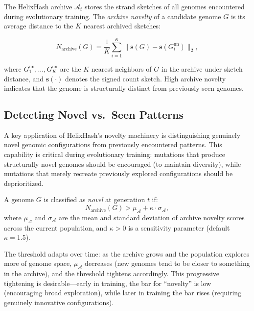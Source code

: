 The HelixHash archive $\mathcal{A}_t$ stores the strand sketches of all genomes encountered during evolutionary training. The \emph{archive novelty} of a candidate genome $G$ is its average distance to the $K$ nearest archived sketches:

\begin{equation}
N_{\text{archive}}(G) = \frac{1}{K} \sum_{i=1}^{K} \|\mathbf{s}(G) - \mathbf{s}(G_i^{\text{nn}})\|_2,
\label{eq:archive-novelty}
\end{equation}

where $G_1^{\text{nn}}, \ldots, G_K^{\text{nn}}$ are the $K$ nearest neighbors of $G$ in the archive under sketch distance, and $\mathbf{s}(\cdot)$ denotes the signed count sketch. High archive novelty indicates that the genome is structurally distinct from previously seen genomes.

\subsection{Detecting Novel vs.\ Seen Patterns}

A key application of HelixHash's novelty machinery is distinguishing genuinely novel genomic configurations from previously encountered patterns. This capability is critical during evolutionary training: mutations that produce structurally novel genomes should be encouraged (to maintain diversity), while mutations that merely recreate previously explored configurations should be deprioritized.

\begin{definition}
\label{def:novelty-threshold}
A genome $G$ is classified as \emph{novel} at generation $t$ if:
\begin{equation}
N_{\text{archive}}(G) > \mu_{\mathcal{A}} + \kappa \cdot \sigma_{\mathcal{A}},
\end{equation}
where $\mu_{\mathcal{A}}$ and $\sigma_{\mathcal{A}}$ are the mean and standard deviation of archive novelty scores across the current population, and $\kappa > 0$ is a sensitivity parameter (default $\kappa = 1.5$).
\end{definition}

The threshold adapts over time: as the archive grows and the population explores more of genome space, $\mu_{\mathcal{A}}$ decreases (new genomes tend to be closer to something in the archive), and the threshold tightens accordingly. This progressive tightening is desirable---early in training, the bar for ``novelty'' is low (encouraging broad exploration), while later in training the bar rises (requiring genuinely innovative configurations).

